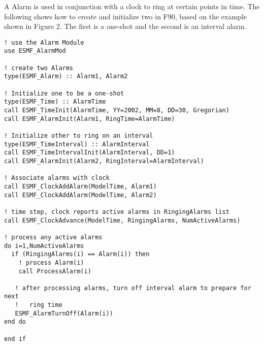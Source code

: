 
A Alarm is used in conjunction with a clock to ring at certain points in time.
The following shows how to create and initialize two in F90, based on the
example shown in Figure 2.  The first is a one-shot and the second is an
interval alarm.

\begin{verbatim}
! use the Alarm Module
use ESMF_AlarmMod

! create two Alarms
type(ESMF_Alarm) :: Alarm1, Alarm2

! Initialize one to be a one-shot
type(ESMF_Time) :: AlarmTime
call ESMF_TimeInit(AlarmTime, YY=2002, MM=8, DD=30, Gregorian)
call ESMF_AlarmInit(Alarm1, RingTime=AlarmTime)

! Initialize other to ring on an interval
type(ESMF_TimeInterval) :: AlarmInterval
call ESMF_TimeIntervalInit(AlarmInterval, DD=1)
call ESMF_AlarmInit(Alarm2, RingInterval=AlarmInterval)

! Associate alarms with clock
call ESMF_ClockAddAlarm(ModelTime, Alarm1)
call ESMF_ClockAddAlarm(ModelTime, Alarm2)

! time step, clock reports active alarms in RingingAlarms list
call ESMF_ClockAdvance(ModelTime, RingingAlarms, NumActiveAlarms)

! process any active alarms
do i=1,NumActiveAlarms
  if (RingingAlarms(i) == Alarm(i)) then
    ! process Alarm(i)
    call ProcessAlarm(i)

   ! after processing alarms, turn off interval alarm to prepare for next
   !   ring time
   ESMF_AlarmTurnOff(Alarm(i))
end do

end if
\end{verbatim}
